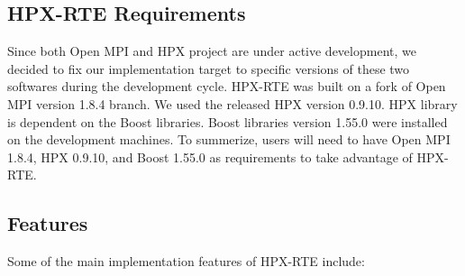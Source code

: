 \subsection{HPX-RTE Requirements}
Since both Open MPI and HPX project are under active development, we decided to fix our implementation target to specific versions of these two softwares during the development cycle. HPX-RTE was built on a fork of Open MPI version 1.8.4 branch. We used the released HPX version 0.9.10. HPX library is dependent on the Boost libraries. Boost libraries version 1.55.0 were installed on the development machines.
To summerize, users will need to have Open MPI 1.8.4, HPX 0.9.10, and Boost 1.55.0 as requirements to take advantage of HPX-RTE.

\subsection{Features}
Some of the main implementation features of HPX-RTE include:

